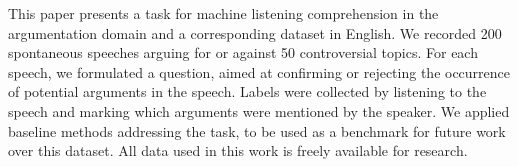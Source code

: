 This paper presents a task for machine listening comprehension in the argumentation domain and a corresponding dataset in English. We recorded 200 spontaneous speeches arguing for or against 50 controversial topics. For each speech, we formulated a question, aimed at confirming or rejecting the occurrence of potential arguments in the speech. Labels were collected by listening to the speech and marking which arguments were mentioned by the speaker. We applied baseline methods addressing the task, to be used as a benchmark for future work over this dataset. All data used in this work is freely available for research.
